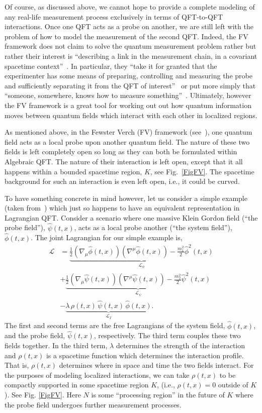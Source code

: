 \documentclass[12pt,prd,superscriptaddress,floatfix,amsmath,amssymb,amsfonts,nofootinbib]{revtex4-2}
\begin{document}
Of course, as discussed above, we cannot hope to provide a complete modeling of any real-life measurement process exclusively in terms of QFT-to-QFT interactions. Once one QFT acts as a probe on another, we are still left with the problem of how to model the measurement of the second QFT. Indeed, the FV framework does not claim to solve the quantum measurement problem rather but rather their interest is ``describing a link in the measurement chain, in a covariant spacetime context''~\cite{fewster1}. In particular, they ``take it for granted that the experimenter has some means of preparing, controlling and measuring the probe and sufficiently separating it from the QFT of interest''~\cite{fewster1} or put more simply that ``someone, somewhere, knows how to measure something''~\cite{FewsterRQITalk3}. Ultimately, however the FV framework is a great tool for working out out how quantum information moves between quantum fields which interact with each other in localized regions.

As mentioned above, in the Fewster Verch (FV) framework (see~\cite{fewster1,fewster2,fewster3,Ruep2021}), one quantum field  acts as a local probe upon another quantum field. The nature of these two fields is left completely open so long as they can both be formulated within Algebraic QFT. The nature of their interaction is left open, except that it all happens within a bounded spacetime region, $K$, see Fig.~\ref{FigFV}. The spacetime background for such an interaction is even left open, i.e., it could be curved. 

To have something concrete in mind however, let us consider a simple example (taken from~\cite{fewster1,Ruep2021}) which just so happens to have an equivalent representation in Lagrangian QFT. Consider a scenario where one massive Klein Gordon field (``the probe field''), $\hat\psi(t,x)$, acts as a local probe another (``the system field''), $\hat\phi(t,x)$. The joint Lagrangian for our simple example is,
\begin{align}\label{LagrangianFV}
\mathcal{L}
&=\underbrace{\frac{1}{2}(\nabla_\mu\hat\phi(t,x))(\nabla^\mu\hat\phi(t,x))
-\frac{m_1^2}{2}\hat\phi^2(t,x)}_{\mathcal{L}_\phi}\\
\nonumber
&+\underbrace{\frac{1}{2}(\nabla_\mu\hat\psi(t,x))(\nabla^\mu\hat\psi(t,x))
-\frac{m_2^2}{2}\hat\psi^2(t,x)}_{\mathcal{L}_\psi}\\
\nonumber
&-\underbrace{\lambda\,\rho(t,x)\,\hat\psi(t,x)\,\hat\phi(t,x)}_{\mathcal{L}_I}.    
\end{align}
The first and second terms are the free Lagrangians of the system field, $\hat\phi(t,x)$, and the probe field, $\hat\psi(t,x)$, respectively. The third term couples these two fields together. In the third term, $\lambda$ determines the strength of the interaction and $\rho(t,x)$ is a spacetime function which determines the interaction profile. That is, $\rho(t,x)$ determines where in space and time the two fields interact. For the purposes of modeling localized interactions, we can take $\rho(t,x)$ to be compactly supported in some spacetime region $K$, (i.e., $\rho(t,x)=0$ outside of $K$). See Fig. \ref{FigFV}. Here $N$ is some ``processing region'' in the future of $K$ where the probe field undergoes further measurement processes. 
\end{document}
